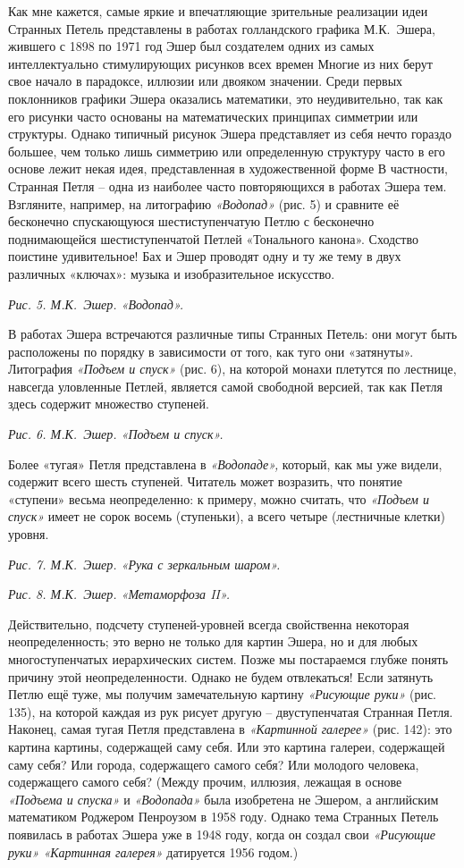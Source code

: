 \documentclass[../main.tex]{subfiles}
\begin{document}
Как мне кажется, самые яркие и впечатляющие зрительные реализации идеи Странных Петель представлены в работах голландского графика М.К.~Эшера, жившего с 1898 по 1971 год Эшер был создателем одних из самых интеллектуально стимулирующих рисунков всех времен Многие из них берут свое начало в парадоксе, иллюзии или двояком значении. Среди первых поклонников графики Эшера оказались математики, это неудивительно, так как его рисунки часто основаны на математических принципах симметрии или структуры. Однако типичный рисунок Эшера представляет из себя нечто гораздо большее, чем только лишь симметрию или определенную структуру часто в его основе лежит некая идея, представленная в художественной форме В частности, Странная Петля \--- одна из наиболее часто повторяющихся в работах Эшера тем. Взгляните, например, на литографию \emph{«Водопад»} (рис. 5) и сравните её бесконечно спускающуюся шестиступенчатую Петлю с бесконечно поднимающейся шестиступенчатой Петлей «Тонального канона». Сходство поистине удивительное! Бах и Эшер проводят одну и ту же тему в двух различных «ключах»: музыка и изобразительное искусство.

\emph{Рис. 5. М.К.~Эшер. «Водопад».}

В работах Эшера встречаются различные типы Странных Петель: они могут быть расположены по порядку в зависимости от того, как туго они «затянуты». Литография \emph{«Подъем и спуск»} (рис. 6), на которой монахи плетутся по лестнице, навсегда уловленные Петлей, является самой свободной версией, так как Петля здесь содержит множество ступеней.

\emph{Рис. 6. М.К.~Эшер. «Подъем и спуск».}

Более «тугая» Петля представлена в \emph{«Водопаде»,} который, как мы уже видели, содержит всего шесть ступеней. Читатель может возразить, что понятие «ступени» весьма неопределенно: к примеру, можно считать, что \emph{«Подъем и спуск»} имеет не сорок восемь (ступеньки), а всего четыре (лестничные клетки) уровня.

\emph{Рис. 7. М.К.~Эшер. «Рука с зеркальным шаром».}

\emph{Рис. 8. М.К.~Эшер. «Метаморфоза II».}

Действительно, подсчету ступеней-уровней всегда свойственна некоторая неопределенность; это верно не только для картин Эшера, но и для любых многоступенчатых иерархических систем. Позже мы постараемся глубже понять причину этой неопределенности. Однако не будем отвлекаться! Если затянуть Петлю ещё туже, мы получим замечательную картину \emph{«Рисующие руки»} (рис. 135), на которой каждая из рук рисует другую \--- двуступенчатая Странная Петля. Наконец, самая тугая Петля представлена в \emph{«Картинной галерее»} (рис. 142): это картина картины, содержащей саму себя. Или это картина галереи, содержащей саму себя? Или города, содержащего самого себя? Или молодого человека, содержащего самого себя? (Между прочим, иллюзия, лежащая в основе \emph{«Подъема и спуска»} и \emph{«Водопада»} была изобретена не Эшером, а английским математиком Роджером Пенроузом в 1958 году. Однако тема Странных Петель появилась в работах Эшера уже в 1948 году, когда он создал свои \emph{«Рисующие руки» «Картинная галерея»} датируется 1956 годом.)
\end{document}
